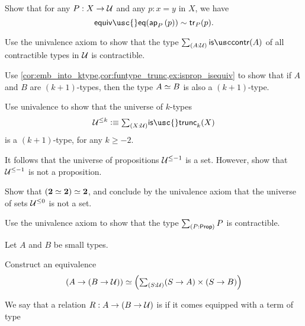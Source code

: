 \begin{exercises}
\item \label{ex:tr_ap} Show that for any $P:X\to \mathcal{U}$ and any $p:x=y$ in $X$, we have
\begin{equation*}
\mathsf{equiv\usc{}eq}(\ap{P}{p})\htpy \mathsf{tr}_P(p).
\end{equation*}
\item \label{ex:istrunc_UUtrunc}
\begin{subexenum}
\item Use the univalence axiom to show that the type $\sm{A:\UU}\iscontr(A)$ of all contractible types in $\mathcal{U}$ is contractible.
\item Use \cref{cor:emb_into_ktype,cor:funtype_trunc,ex:isprop_isequiv} to show that if $A$ and $B$ are $(k+1)$-types, then the type $\eqv{A}{B}$ is also a $(k+1)$-type.
\item Use univalence to show that the universe of $k$-types
\begin{equation*}
\UU^{\leq k}\defeq \sm{X:\UU}\mathsf{is\usc{}trunc}_k(X)
\end{equation*}
is a $(k+1)$-type, for any $k\geq -2$.
\item It follows that the universe of propositions $\mathcal{U}^{\leq-1}$ is a set. However, show that $\mathcal{U}^{\leq-1}$ is not a proposition.
\item Show that $\eqv{(\eqv{\bool}{\bool})}{\bool}$, and conclude by the univalence axiom that the universe of sets $\mathcal{U}^{\leq 0}$ is not a set. 
\end{subexenum}
\item Use the univalence axiom to show that the type $\sm{P:\prop}P$ is contractible.
\item Let $A$ and $B$ be small types. 
\begin{subexenum}
\item Construct an equivalence
\begin{equation*}
\eqv{(A\to (B\to\UU))}{\Big(\sm{S:\UU} (S\to A)\times (S\to B)\Big)}
\end{equation*}
\item We say that a relation $R:A\to (B\to\mathcal{U})$ is  if it comes equipped with a term of type

\end{subexenum}
\end{exercises}
